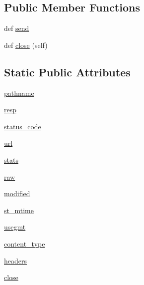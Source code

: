 \subsection*{Public Member Functions}
\begin{DoxyCompactItemize}
\item 
def \hyperlink{classpip_1_1__internal_1_1network_1_1session_1_1LocalFSAdapter_aa61c57f5fa3d74b62303ce5bb31a34a8}{send}
\item 
def \hyperlink{classpip_1_1__internal_1_1network_1_1session_1_1LocalFSAdapter_af6f27e6a5199809dd8532e399d3dd6bb}{close} (self)
\end{DoxyCompactItemize}
\subsection*{Static Public Attributes}
\begin{DoxyCompactItemize}
\item 
\hyperlink{classpip_1_1__internal_1_1network_1_1session_1_1LocalFSAdapter_a19a234b7741e3fc35eb9365d15758a2b}{pathname}
\item 
\hyperlink{classpip_1_1__internal_1_1network_1_1session_1_1LocalFSAdapter_aea1aa75b41179c3feb5a5d527c940ab5}{resp}
\item 
\hyperlink{classpip_1_1__internal_1_1network_1_1session_1_1LocalFSAdapter_aa96d0866ed0894002ea9c3ae5f4504fd}{status\+\_\+code}
\item 
\hyperlink{classpip_1_1__internal_1_1network_1_1session_1_1LocalFSAdapter_ac7667d6fc205b8e9670e8ba7b2322ca2}{url}
\item 
\hyperlink{classpip_1_1__internal_1_1network_1_1session_1_1LocalFSAdapter_ad0947fe88394e40f6a54c40c7892ae31}{stats}
\item 
\hyperlink{classpip_1_1__internal_1_1network_1_1session_1_1LocalFSAdapter_a5d3df5c8b481f674f9916c3191215bd7}{raw}
\item 
\hyperlink{classpip_1_1__internal_1_1network_1_1session_1_1LocalFSAdapter_a0aab00b3590b43cfa3d6696f06aeb622}{modified}
\item 
\hyperlink{classpip_1_1__internal_1_1network_1_1session_1_1LocalFSAdapter_a2407b26424193fbd12ec7b46aad79ef3}{st\+\_\+mtime}
\item 
\hyperlink{classpip_1_1__internal_1_1network_1_1session_1_1LocalFSAdapter_a4627f08cb6aa44f8789dbcd9d795525e}{usegmt}
\item 
\hyperlink{classpip_1_1__internal_1_1network_1_1session_1_1LocalFSAdapter_a0e7a95bbe5d57e2639bb8b535fdfc96e}{content\+\_\+type}
\item 
\hyperlink{classpip_1_1__internal_1_1network_1_1session_1_1LocalFSAdapter_a75abe3df81485569a99059b408923037}{headers}
\item 
\hyperlink{classpip_1_1__internal_1_1network_1_1session_1_1LocalFSAdapter_a3f2c41025ef345c351d063e4048db77f}{close}
\end{DoxyCompactItemize}


